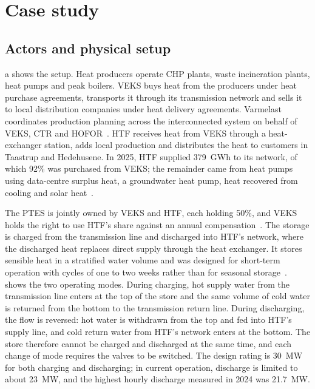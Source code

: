 \section{Case study}
\label{sec:case_study}

\subsection{Actors and physical setup}

a shows the setup. Heat producers operate CHP plants, waste incineration plants, heat pumps and peak boilers. VEKS buys heat from the producers under heat purchase agreements, transports it through its transmission network and sells it to local distribution companies under heat delivery agreements. Varmelast coordinates production planning across the interconnected system on behalf of VEKS, CTR and HOFOR~\cite{varmelast_dispatch}. HTF receives heat from VEKS through a heat-exchanger station, adds local production and distributes the heat to customers in Taastrup and Hedehusene. In 2025, HTF supplied 379~GWh to its network, of which 92\% was purchased from VEKS; the remainder came from heat pumps using data-centre surplus heat, a groundwater heat pump, heat recovered from cooling and solar heat~\cite{htf_annual_report_2025}.

The PTES is jointly owned by VEKS and HTF, each holding 50\%, and VEKS holds the right to use HTF's share against an annual compensation~\cite{planenergi_hoje_taastrup}. The storage is charged from the transmission line and discharged into HTF's network, where the discharged heat replaces direct supply through the heat exchanger. It stores sensible heat in a stratified water volume and was designed for short-term operation with cycles of one to two weeks rather than for seasonal storage~\cite{sifnaios2025performance}.  shows the two operating modes. During charging, hot supply water from the transmission line enters at the top of the store and the same volume of cold water is returned from the bottom to the transmission return line. During discharging, the flow is reversed: hot water is withdrawn from the top and fed into HTF's supply line, and cold return water from HTF's network enters at the bottom. The store therefore cannot be charged and discharged at the same time, and each change of mode requires the valves to be switched. The design rating is 30~MW for both charging and discharging; in current operation, discharge is limited to about 23~MW, and the highest hourly discharge measured in 2024 was 21.7~MW.


